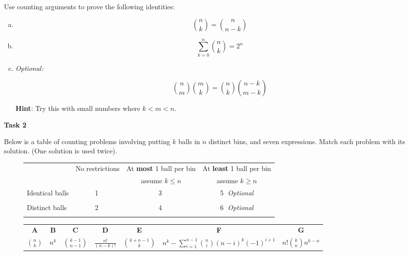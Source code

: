 \documentclass[12pt,letterpaper]{article}
\newcommand\hint[1]{\textbf{Hint}: #1}
\newenvironment{22enumerate}{\begin{enumerate}[a.]\itemsep0em}{\end{enumerate}}
\begin{document}
	Use counting arguments to prove the following identities:
	\begin{22enumerate}
	    \item $$\binom{n}{k} = \binom{n}{n - k}$$
	    \begin{mdframed} \vspace{3cm} \end{mdframed}
	   
    	\item $$\sum_{k = 0}^{n} \binom{n}{k} = 2^n$$
        \begin{mdframed} \vspace{3cm} \end{mdframed}
        
        \item \textit{Optional: }
        
        $$\binom{n}{m}\binom{m}{k} = \binom{n}{k}\binom{n - k}{m - k}$$
        
        \hint{Try this with small numbers where $k < m < n$.}
        \begin{mdframed} \vspace{3cm} \end{mdframed}
    \end{22enumerate}

\newpage
\textbf{Task 2}

Below is a table of counting problems involving putting $k$ balls in $n$ distinct bins, and seven expressions. Match each problem with its solution. (One solution is used twice).
\vspace{0.5cm}
\begin{figure}[h]
    \centering
    \begin{tabular}{p{2.5cm}|c|c|c}
    & No restrictions & At \textbf{most} 1 ball per bin & At \textbf{least} 1 ball per bin  \\
    & & \small assume $k \leq n$ & \small assume $k \geq n$\\
    \hline
    Identical balls & \small \textcircled{1}& \small \textcircled{3} & \small \textcircled{5} \textit{Optional} \\
    &  &\\
    \hline
    Distinct balls &\small \textcircled{2} &\small \textcircled{4} & \small \textcircled{6} \textit{Optional} \\
    & &\\
\end{tabular}
\begin{tabular}{ccccccc}
    \\
    \textbf{A} & \textbf{B} & \textbf{C} & \textbf{D} & \textbf{E} & \textbf{F} & \textbf{G}\\
    \large $\binom{n}{k}$ & \large $n^k$ & \large $\binom{k-1}{n-1}$ & \large $\frac{n!}{(n-k)!}$ & \large $\binom{k+n-1}{k}$ & \large $n^k-\sum_{i=1}^{n-1} \binom{n}{i} (n-i)^k (-1)^{i+1}$& $n!{{k}\choose{n}}n^{k-n}$ \\
\end{tabular}
\end{figure}
\begin{mdframed} \vspace{4cm} \end{mdframed}
\end{document}
